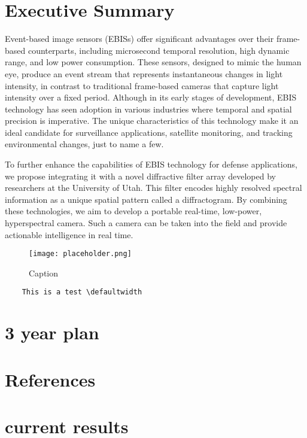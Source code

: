 \documentclass[12pt]{article}
\begin{document}
\section{Executive Summary}
Event-based image sensors (EBISs) offer significant advantages over their frame-based counterparts, including microsecond temporal resolution, high dynamic range, and low power consumption. These sensors, designed to mimic the human eye, produce an event stream that represents instantaneous changes in light intensity, in contrast to traditional frame-based cameras that capture light intensity over a fixed period. Although in its early stages of development, EBIS technology has seen adoption in various industries where temporal and spatial precision is imperative.  The unique characteristics of this technology make it an ideal candidate for surveillance applications, satellite monitoring, and tracking environmental changes, just to name a few.

To further enhance the capabilities of EBIS technology for defense applications, we propose integrating it with a novel diffractive filter array developed by researchers at the University of Utah. This filter encodes highly resolved spectral information as a unique spatial pattern called a diffractogram. By combining these technologies, we aim to develop a  portable real-time, low-power, hyperspectral camera. Such a camera can be taken into the field and provide actionable intelligence in real time. 

\begin{figure}
    \centering
    \texttt{[image: placeholder.png]}
    \caption{Caption}
    \label{fig:enter-label}
\end{figure}

\begin{verbatim}
    This is a test \defaultwidth
\end{verbatim}

\section{3 year plan}

\section{References}

\section{current results}
\end{document}
